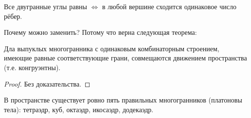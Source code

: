 \begin{remark}
    Все двугранные углы равны $\Leftrightarrow$ в любой вершине сходится одинаковое число рёбер.
\end{remark}

Почему можно заменить? Потому что верна следующая теорема:

\begin{theorem}[Коши]
    Дла выпуклых многогранника с одинаковым комбинаторным строением, имеющие равные соответствующие грани, совмещаются движением пространства (т.е. конгруэнтны).
\end{theorem}
\begin{proof}
    Без доказательства.
\end{proof}

\begin{theorem}
    В пространстве существует ровно пять правильных многогранников (платоновы тела): тетраэдр, куб, октаэдр, икосаэдр, додекаэдр.
\end{theorem}
